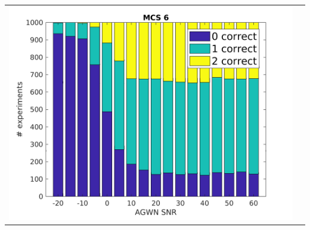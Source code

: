\documentclass[accentcolor=tud8b,colorbacktitle]{tudbeamer}
\begin{document}
\begin{frame}
\begin{tabular}{cc}
		\includegraphics[height=0.52\textheight]{../../gfx/plots/awgn-mcs6} \\
	\end{tabular}
\end{frame}
\end{document}

